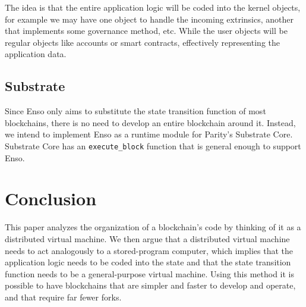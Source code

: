 \documentclass[conference]{IEEEtran}
\begin{document}
The idea is that the entire application logic will be coded into the kernel objects, for example we may have one object to handle the incoming extrinsics, another that implements some governance method, etc. While the user objects will be regular objects like accounts or smart contracts, effectively representing the application data.

\subsection{Substrate}
Since Enso only aims to substitute the state transition function of most blockchains, there is no need to develop an entire blockchain around it. Instead, we intend to implement Enso as a runtime module for Parity's Substrate Core. Substrate Core has an \texttt{execute\_block} function that is general enough to support Enso.

\section{Conclusion}
This paper analyzes the organization of a blockchain's code by thinking of it as a distributed virtual machine. We then argue that a distributed virtual machine needs to act analogously to a stored-program computer, which implies that the application logic needs to be coded into the state and that the state transition function needs to be a general-purpose virtual machine. Using this method it is possible to have blockchains that are simpler and faster to develop and operate, and that require far fewer forks.




\end{document}
